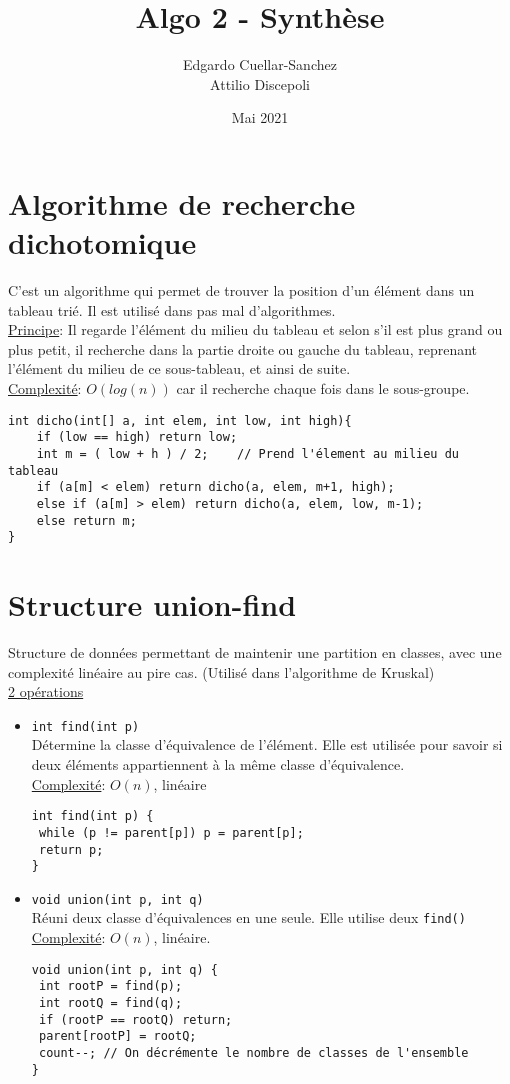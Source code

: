\documentclass[10pt]{article}
\author{Edgardo Cuellar-Sanchez \\ Attilio Discepoli}
\date{Mai 2021}
\title{Algo 2 - Synthèse}
\begin{document}
\maketitle
\tableofcontents

\section{Algorithme de recherche dichotomique}
C'est un algorithme qui permet de trouver la position d'un élément dans un tableau trié. Il est utilisé dans pas mal d'algorithmes.
\\
\underline{Principe}: Il regarde l'élément du milieu du tableau et selon s'il est plus grand ou plus petit, il recherche dans la partie droite ou gauche du tableau, reprenant l'élément du milieu de ce sous-tableau, et ainsi de suite.
\\
\underline{Complexité}: $O(log(n))$ car il recherche chaque fois dans le sous-groupe.
\begin{verbatim}
int dicho(int[] a, int elem, int low, int high){
	if (low == high) return low;
	int m = ( low + h ) / 2;	// Prend l'élement au milieu du tableau
	if (a[m] < elem) return dicho(a, elem, m+1, high);
	else if (a[m] > elem) return dicho(a, elem, low, m-1);
	else return m;
}
\end{verbatim}

\section{Structure union-find}
Structure de données permettant de maintenir une partition en classes, avec une complexité linéaire au pire cas. (Utilisé dans l'algorithme de Kruskal)
\\
\underline{2 opérations}
\begin{itemize}
\item \verb|int find(int p)| 
\\Détermine la classe d'équivalence de l'élément. Elle est utilisée pour savoir si deux éléments appartiennent à la même classe d'équivalence. \\\underline{Complexité}: $O(n)$, linéaire
\begin{verbatim}
int find(int p) {
 while (p != parent[p]) p = parent[p];
 return p;
}
\end{verbatim}

\item \verb|void union(int p, int q)| 
\\Réuni deux classe d'équivalences en une seule. Elle utilise deux \verb|find()|
\\\underline{Complexité}: $O(n)$, linéaire.
\begin{verbatim}
void union(int p, int q) {
 int rootP = find(p);
 int rootQ = find(q);
 if (rootP == rootQ) return;
 parent[rootP] = rootQ;
 count--; // On décrémente le nombre de classes de l'ensemble
}
\end{verbatim}
\end{itemize}
\end{document}

